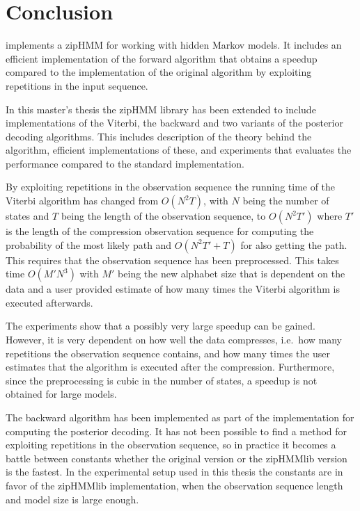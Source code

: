 
\chapter{Conclusion}
\label{cha:conclusion}

\citet{sand2013ziphmmlib} implements a zipHMM for working with hidden Markov
models. It includes an efficient implementation of the forward algorithm that
obtains a speedup compared to the implementation of the original algorithm by
exploiting repetitions in the input sequence.

In this master's thesis the zipHMM library has been extended to include
implementations of the Viterbi, the backward and two variants of the posterior
decoding algorithms. This includes description of the theory behind the
algorithm, efficient implementations of these, and experiments that evaluates
the performance compared to the standard implementation.

By exploiting repetitions in the observation sequence the running time of the
Viterbi algorithm has changed from $O(N^2 T)$, with $N$ being the number of
states and $T$ being the length of the observation sequence, to $O(N^2 T')$
where $T'$ is the length of the compression observation sequence for computing
the probability of the most likely path and $O(N^2 T' + T)$ for also getting
the path. This requires that the observation sequence has been preprocessed.
This takes time $O(M' N^3)$ with $M'$ being the new alphabet size that is
dependent on the data and a user provided estimate of how many times the
Viterbi algorithm is executed afterwards.

The experiments show that a possibly very large speedup can be gained. However,
it is very dependent on how well the data compresses, i.e.\ how many repetitions
the observation sequence contains, and how many times the user estimates that the
algorithm is executed after the compression. Furthermore, since the
preprocessing is cubic in the number of states, a speedup is not obtained for
large models.

The backward algorithm has been implemented as part of the implementation for
computing the posterior decoding. It has not been possible to find a method for
exploiting repetitions in the observation sequence, so in practice it becomes a
battle between constants whether the original version or the zipHMMlib version
is the fastest. In the experimental setup used in this thesis the constants are
in favor of the zipHMMlib implementation, when the observation sequence length and
model size is large enough.

